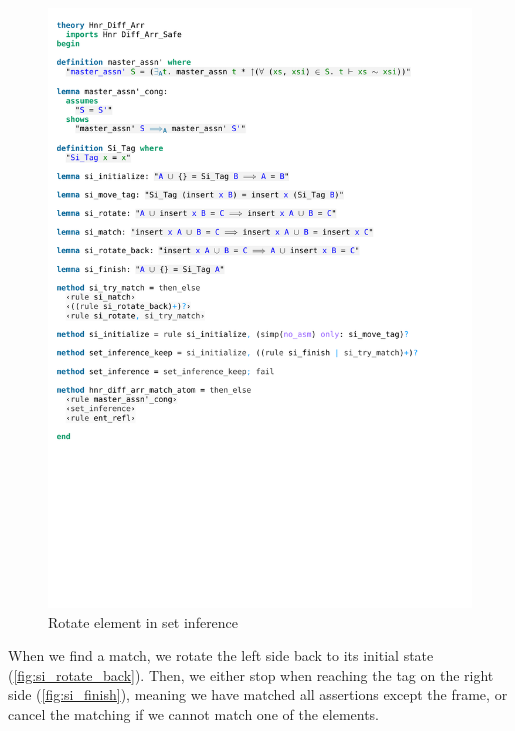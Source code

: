 \begin{figure}[htpb]
    \includegraphics[trim={0 19,2cm 0 10cm}, clip, width=1.00\textwidth]{figures/Theory_Hnr_Diff_Arr_SI.pdf}
    \caption[Rotate element in set inference]{Rotate element in set inference}
    \label{fig:si_rotate}
\end{figure}

\noindent When we find a match, we rotate the left side back to its initial state (\autoref{fig:si_rotate_back}). Then, we either stop when reaching the tag on the right side (\autoref{fig:si_finish}), meaning we have matched all assertions except the frame, or cancel the matching if we cannot match one of the elements. 

